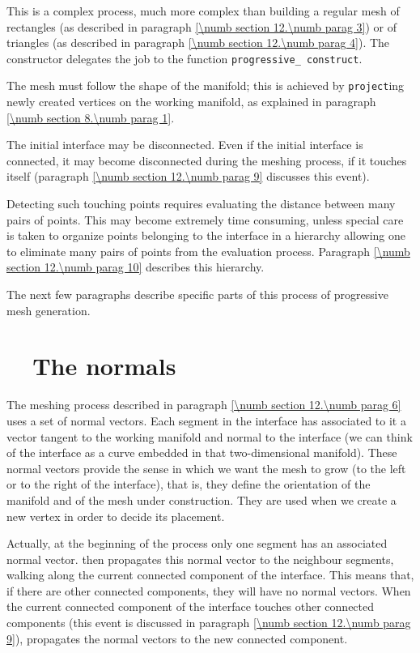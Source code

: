 This is a complex process, much more complex than building a regular mesh of rectangles
(as described in paragraph \ref{\numb section 12.\numb parag 3}) or of triangles (as described
in paragraph \ref{\numb section 12.\numb parag 4}).
The constructor delegates the job to the function {\small\tt progressive\_\,construct}.

The mesh must follow the shape of the manifold; this is achieved by {\small\tt project}ing
newly created vertices on the working manifold, as explained in paragraph
\ref{\numb section 8.\numb parag 1}.

The initial interface may be disconnected.
Even if the initial interface is connected, it may become disconnected during the meshing
process, if it touches itself (paragraph \ref{\numb section 12.\numb parag 9}
discusses this event).

Detecting such touching points requires evaluating the distance between many pairs of points.
This may become extremely time consuming, unless special care is taken to organize points
belonging to the interface in a hierarchy allowing one to eliminate many pairs of points
from the evaluation process.
Paragraph \ref{\numb section 12.\numb parag 10} describes this hierarchy.

The next few paragraphs describe specific parts of this process of progressive mesh generation.


\section{~~The normals}\label{\numb section 12.\numb parag 7}

The meshing process described in paragraph \ref{\numb section 12.\numb parag 6} uses a set of
normal vectors.
Each segment in the interface has associated to it
a vector tangent to the working manifold and normal to the interface (we can
think of the interface as a curve embedded in that two-dimensional manifold).
These normal vectors provide the sense in which we want the mesh to grow (to the left or to
the right of the interface), that is, they define the orientation of the manifold and of
the mesh under construction.
They are used when we create a new vertex in order to decide its placement.

Actually, at the beginning of the process only one segment has an associated normal vector.
{\ManiFEM} then propagates this normal vector to the neighbour segments, walking along
the current connected component of the interface.
This means that, if there are other connected components, they will have no normal vectors.
When the current connected component of the interface touches other connected components
(this event is discussed in paragraph \ref{\numb section 12.\numb parag 9}), {\maniFEM}
propagates the normal vectors to the new connected component.

